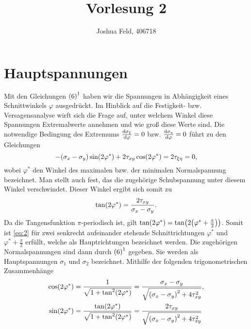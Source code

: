 \documentclass{lecture}
\institute{Lehr- und Forschungsgebiet Kontinuumsmechanik}
\title{Vorlesung 2}
\author{Joshua Feld, 406718}
\begin{document}
    \maketitle


    \section*{Hauptspannungen}

    Mit den Gleichungen \(\textup{(6)}^1\) haben wir die Spannungen in Abhängigkeit eines Schnittwinkels \(\varphi\) ausgedrückt.
    Im Hinblick auf die Festigkeit- bzw. Versagensanalyse wirft sich die Frage auf, unter welchem Winkel diese Spannungen Extremalwerte annehmen und wie groß diese Werte sind.
    Die notwendige Bedingung des Extremums \(\frac{\mathop{\mathrm{d}\!}\sigma_\xi}{\mathop{\mathrm{d}\!}\varphi} = 0\) bzw. \(\frac{\mathop{\mathrm{d}\!}\sigma_\eta}{\mathop{\mathrm{d}\!}\varphi} = 0\) führt zu den Gleichungen
    \begin{equation}\label{eq:1}
        -\parentheses*{\sigma_x - \sigma_y}\sin\parentheses*{2\varphi^*} + 2\tau_{xy}\cos\parentheses*{2\varphi^*} = 2\tau_{\xi\eta} = 0,
    \end{equation}
    wobei \(\varphi^*\) den Winkel des maximalen bzw. der minimalen Normalspannung bezeichnet.
    Man stellt auch fest, das die zugehörige Schubspannung unter diesem Winkel verschwindet.
    Dieser Winkel ergibt sich somit zu
    \begin{equation}\label{eq:2}
        \tan\parentheses*{2\varphi^*} = \frac{2\tau_{xy}}{\sigma_x - \sigma_y}.
    \end{equation}
    Da die Tangensfunktion \(\pi\)-periodisch ist, gilt \(\tan\parentheses*{2\varphi^*} = \tan\parentheses*{2\parentheses*{\varphi^* + \frac{\pi}{2}}}\).
    Somit ist \eqref{eq:2} für zwei senkrecht aufeinander stehende Schnittrichtungen \(\varphi^*\) und \(\varphi^* + \frac{\pi}{2}\) erfüllt, welche als Hauptrichtungen bezeichnet werden.
    Die zugehörigen Normalspannungen sind dann durch \(\textup{(6)}^1\) gegeben.
    Sie werden als Hauptspannungen \(\sigma_1\) und \(\sigma_2\) bezeichnet.
    Mithilfe der folgenden trigonometrischen Zusammenhänge
    \begin{align*}
        \cos\parentheses*{2\varphi^*} &= \frac{1}{\sqrt{1 + \tan^2\parentheses*{2\varphi^*}}} = \frac{\sigma_x - \sigma_y}{\sqrt{\parentheses*{\sigma_x - \sigma_y}^2 + 4\tau_{xy}^2}},\\
        \sin\parentheses*{2\varphi^*} &= \frac{\tan\parentheses*{2\varphi^*}}{\sqrt{1 + \tan^2\parentheses*{2\varphi^*}}} = \frac{2\tau_{xy}}{\sqrt{\parentheses*{\sigma_x - \sigma_y}^2 + 4\tau_{xy}^2}}
    \end{align*}
\end{document}
